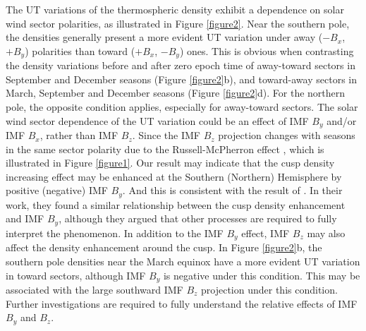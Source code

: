 \documentclass[draft, grl]{/home/guod/Documents/template/agu_template/AGUTeX}
\begin{document}
\begin{article}
    The UT variations of the thermospheric density exhibit a dependence on solar
    wind sector polarities, as illustrated in Figure \ref{figure2}. 
    Near the southern pole, the densities generally present a more evident UT 
    variation under away ($-B_x$, $+B_y$) polarities than toward ($+B_x$, 
    $-B_y$) ones.
    This is obvious when contrasting the density variations before and after 
    zero epoch time of away-toward sectors in September and December seasons 
    (Figure \ref{figure2}b), and toward-away sectors in March, September and 
    December seasons (Figure \ref{figure2}d).
    For the northern pole, the opposite condition applies, especially for 
    away-toward sectors.
    The solar wind sector dependence of the UT variation could be an effect of
    IMF $B_y$ and/or IMF $B_x$, rather than IMF $B_z$. 
    Since the IMF $B_z$ projection changes with seasons in the same sector 
    polarity due to the Russell-McPherron effect \citep{Russell1973}, which is
    illustrated in Figure \ref{figure1}.
    Our result may indicate that the cusp density increasing effect may be 
    enhanced at the Southern (Northern) Hemisphere by positive (negative) IMF 
    $B_y$.
    And this is consistent with the result of \citet{Yamazaki2015a}. 
    In their work, they found a similar relationship between the cusp density 
    enhancement and IMF $B_y$, although they argued that other processes are 
    required to fully interpret the phenomenon.
    In addition to the IMF $B_y$ effect, IMF $B_z$ may also affect the density 
    enhancement around the cusp. 
    In Figure \ref{figure2}b, the southern pole densities near the March equinox
    have a more evident UT variation in toward sectors, although IMF $B_y$ is
    negative under this condition. 
    This may be associated with the large southward IMF $B_z$ projection under 
    this condition.
    Further investigations are required to fully understand the relative effects
    of IMF $B_y$ and $B_z$.


\end{article}
\end{document}
